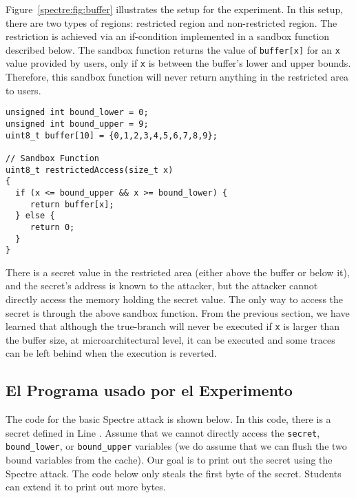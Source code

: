 Figure~\ref{spectre:fig:buffer} illustrates the setup for the experiment.
In this setup, there are two types of regions: restricted region and non-restricted region.
The restriction is achieved via an if-condition implemented in a sandbox function
described below. The sandbox function returns the value of \texttt{buffer[x]} for an \texttt{x}
value provided by users, only if \texttt{x} is between the buffer's
lower and upper bounds.
Therefore, this sandbox function
will never return anything in the restricted area to users.


\begin{lstlisting}
unsigned int bound_lower = 0;
unsigned int bound_upper = 9;
uint8_t buffer[10] = {0,1,2,3,4,5,6,7,8,9};

// Sandbox Function
uint8_t restrictedAccess(size_t x)
{
  if (x <= bound_upper && x >= bound_lower) {
     return buffer[x];
  } else {
     return 0;
  }
}
\end{lstlisting}

There is a secret value in the restricted area (either above the buffer
or below it), and the secret's address is known to the attacker, but
the attacker cannot directly access the memory holding the secret value.
The only way to access the
secret is through the above sandbox function. From the previous section, we have learned that
although the true-branch will never be executed if \texttt{x} is larger than the buffer size,
at microarchitectural level, it can be executed and some traces can be left behind
when the execution is reverted.


\subsection{El Programa usado por el Experimento}


The code for the basic Spectre attack is shown below. In this code, there is a
secret defined in Line . Assume that we cannot directly
access the \texttt{secret}, \texttt{bound\_lower}, or 
\texttt{bound\_upper} variables (we do assume that we
can flush the two bound variables from the cache). 
Our goal is to print out the secret
using the Spectre attack. The code below only steals the first byte of the secret. Students can
extend it to print out more bytes. 


